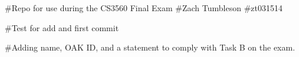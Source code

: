 \#\+Repo for use during the C\+S3560 Final Exam \#\+Zach Tumbleson \#zt031514

\#\+Test for add and first commit

\#\+Adding name, O\+AK ID, and a statement to comply with Task B on the exam. 